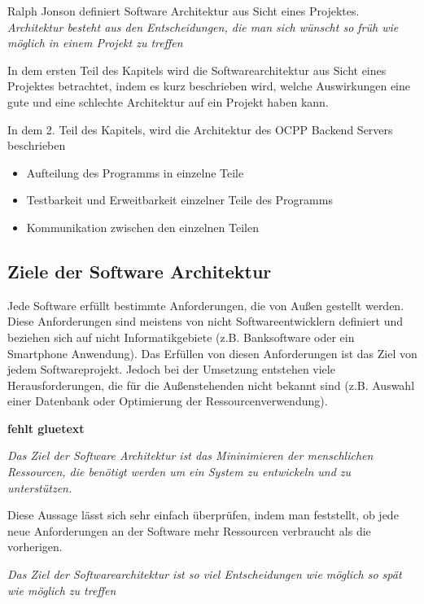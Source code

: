 \documentclass{article}
\begin{document}
    Ralph Jonson definiert Software Architektur aus Sicht eines Projektes.\\
    \textit{Architektur besteht aus den Entscheidungen, die man sich wünscht so früh wie möglich in einem Projekt zu treffen}
    \cite{MF_WhatIsSA}

    In dem ersten Teil des Kapitels wird die Softwarearchitektur aus Sicht eines Projektes betrachtet, 
    indem es kurz beschrieben wird, welche Auswirkungen eine gute und eine schlechte Architektur auf ein Projekt haben kann.

    In dem 2. Teil des Kapitels, wird die Architektur des OCPP Backend Servers beschrieben
    \begin{itemize}
        \item Aufteilung des Programms in einzelne Teile
        \item Testbarkeit und Erweitbarkeit einzelner Teile des Programms
        \item Kommunikation zwischen den einzelnen Teilen
    \end{itemize}

    \subsection{Ziele der Software Architektur}

    Jede Software erfüllt bestimmte Anforderungen, die von Außen gestellt werden. 
    Diese Anforderungen sind meistens von nicht Softwareentwicklern definiert und beziehen sich auf nicht Informatikgebiete 
    (z.B. Banksoftware oder ein Smartphone Anwendung). 
    Das Erfüllen von diesen Anforderungen ist das Ziel von jedem Softwareprojekt.
    Jedoch bei der Umsetzung entstehen viele Herausforderungen, die für die Außenstehenden nicht bekannt sind 
    (z.B. Auswahl einer Datenbank oder Optimierung der Ressourcenverwendung). 

    \textbf{fehlt gluetext}

    \textit{Das Ziel der Software Architektur ist das Mininimieren der menschlichen Ressourcen, 
    die benötigt werden um ein System zu entwickeln und zu unterstützen.}\cite[5]{cleanArchitecture}

    Diese Aussage lässt sich sehr einfach überprüfen, indem man feststellt, 
    ob jede neue Anforderungen an der Software mehr Ressourcen verbraucht als die vorherigen.

    \textit{Das Ziel der Softwarearchitektur ist so viel Entscheidungen wie möglich so spät wie möglich zu treffen}
    \cite[136]{cleanArchitecture}
\end{document}
